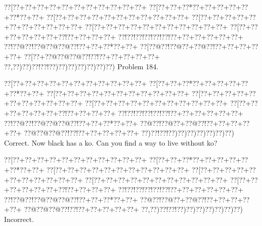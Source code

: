\documentclass[a5paper]{article}
\begin{document}
\begin{center}
{\goo
\0??[\0??+\0??+\0??+\0??+\0??+\0??+\0??+\0??+\0??+\0??+\0??+
\0??[\0??+\0??+\0??*\0??+\0??+\0??+\0??+\0??+\0??*\0??+\0??+
\0??[\0??+\0??+\0??+\0??+\0??+\0??+\0??+\0??+\0??+\0??+\0??+
\0??[\0??+\0??+\0??+\0??+\0??+\0??+\0??+\0??+\0??+\0??+\0??+
\0??[\0??+\0??+\0??+\0??+\0??+\0??+\0??+\0??+\0??+\0??+\0??+
\0??[\0??+\0??+\0??+\0??+\0??+\0??+\0??!\0??+\0??+\0??+\0??+
\0??!\0??!\0??!\0??!\0??!\0??!\0??+\0??+\0??+\0??+\0??+\0??+
\0??!\0??@\0??!\0??@\0??@\0??@\0??!\0??+\0??+\0??*\0??+\0??+
\0??[\0??@\0??!\0??@\0??+\0??@\0??!\0??+\0??+\0??+\0??+\0??+
\0??[\0??+\0??@\0??@\0??@\0??!\0??!\0??+\0??+\0??+\0??+\0??+
\0??,\0??)\0??)\0??!\0??!\0??)\0??)\0??)\0??)\0??)\0??)\0??)
}
Problem 184.

\end{center}
\begin{center}
{\goo
\0??[\0??+\0??+\0??+\0??+\0??+\0??+\0??+\0??+\0??+\0??+\0??+
\0??[\0??+\0??+\0??*\0??+\0??+\0??+\0??+\0??+\0??*\0??+\0??+
\0??[\0??+\0??+\0??+\0??+\0??+\0??+\0??+\0??+\0??+\0??+\0??+
\0??[\0??+\0??+\0??+\0??+\0??+\0??+\0??+\0??+\0??+\0??+\0??+
\0??[\0??+\0??+\0??+\0??+\0??+\0??+\0??+\0??+\0??+\0??+\0??+
\0??[\0??+\0??+\0??+\0??+\0??+\0??+\0??!\0??+\0??+\0??+\0??+
\0??!\0??!\0??!\0??!\0??!\0??!\0??+\0??+\0??+\0??+\0??+\0??+
\0??!\0??@\0??!\0??@\0??@\0??@\0??!\0??+\0??+\0??*\0??+\0??+
\0??@\0??!\0??@\0??+\0??@\0??!\0??+\0??+\0??+\0??+\0??+
\0??@\0??@\0??@\0??!\0??!\0??+\0??+\0??+\0??+\0??+
\0??)\0??!\0??!\0??)\0??)\0??)\0??)\0??)\0??)\0??)
}
Correct. Now black has a ko. Can you find a way to live without ko?

\end{center}
\begin{center}
{\goo
\0??[\0??+\0??+\0??+\0??+\0??+\0??+\0??+\0??+\0??+\0??+\0??+
\0??[\0??+\0??+\0??*\0??+\0??+\0??+\0??+\0??+\0??*\0??+\0??+
\0??[\0??+\0??+\0??+\0??+\0??+\0??+\0??+\0??+\0??+\0??+\0??+
\0??[\0??+\0??+\0??+\0??+\0??+\0??+\0??+\0??+\0??+\0??+\0??+
\0??[\0??+\0??+\0??+\0??+\0??+\0??+\0??+\0??+\0??+\0??+\0??+
\0??[\0??+\0??+\0??+\0??+\0??+\0??+\0??!\0??+\0??+\0??+\0??+
\0??!\0??!\0??!\0??!\0??!\0??!\0??+\0??+\0??+\0??+\0??+\0??+
\0??!\0??@\0??!\0??@\0??@\0??@\0??!\0??+\0??+\0??*\0??+\0??+
\0??@\0??!\0??@\0??+\0??@\0??!\0??+\0??+\0??+\0??+\0??+
\0??@\0??@\0??@\0??!\0??!\0??+\0??+\0??+\0??+\0??+
\0??,\0??)\0??!\0??!\0??)\0??)\0??)\0??)\0??)\0??)\0??)
}
Incorrect. 

\end{center}
\end{document}
